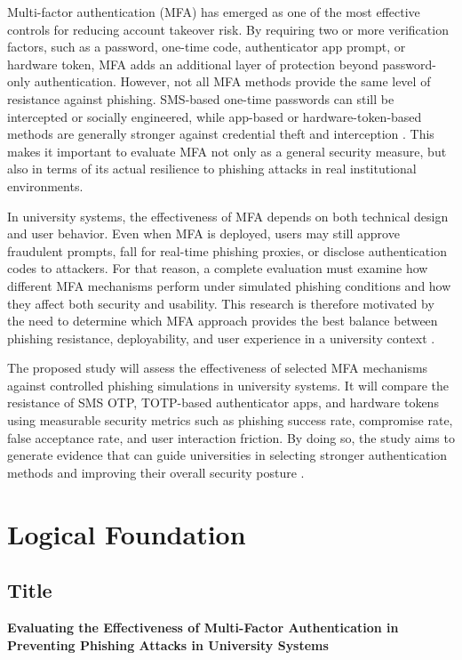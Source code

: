 \documentclass[11pt]{article}
\begin{document}
Multi-factor authentication (MFA) has emerged as one of the most effective controls for reducing account takeover risk. By requiring two or more verification factors, such as a password, one-time code, authenticator app prompt, or hardware token, MFA adds an additional layer of protection beyond password-only authentication. However, not all MFA methods provide the same level of resistance against phishing. SMS-based one-time passwords can still be intercepted or socially engineered, while app-based or hardware-token-based methods are generally stronger against credential theft and interception \cite{almashhadi2024sms,kumar2023mfatyperesist}. This makes it important to evaluate MFA not only as a general security measure, but also in terms of its actual resilience to phishing attacks in real institutional environments.

In university systems, the effectiveness of MFA depends on both technical design and user behavior. Even when MFA is deployed, users may still approve fraudulent prompts, fall for real-time phishing proxies, or disclose authentication codes to attackers. For that reason, a complete evaluation must examine how different MFA mechanisms perform under simulated phishing conditions and how they affect both security and usability. This research is therefore motivated by the need to determine which MFA approach provides the best balance between phishing resistance, deployability, and user experience in a university context \cite{chen2025mlpush,tesfaye2025ethiopia}.

The proposed study will assess the effectiveness of selected MFA mechanisms against controlled phishing simulations in university systems. It will compare the resistance of SMS OTP, TOTP-based authenticator apps, and hardware tokens using measurable security metrics such as phishing success rate, compromise rate, false acceptance rate, and user interaction friction. By doing so, the study aims to generate evidence that can guide universities in selecting stronger authentication methods and improving their overall security posture \cite{almashhadi2024sms,kumar2023mfatyperesist}.

\section{Logical Foundation}
\subsection{Title}
\textbf{Evaluating the Effectiveness of Multi-Factor Authentication in Preventing Phishing Attacks in University Systems}
\end{document}
